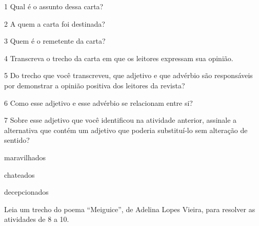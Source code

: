 \num{1} Qual é o assunto dessa carta?


\num{2} A quem a carta foi destinada?


\num{3} Quem é o remetente da carta?


\num{4} Transcreva o trecho da carta em que os leitores expressam sua opinião.


\num{5} Do trecho que você transcreveu, que adjetivo e que advérbio são responsáveis por demonstrar a opinião positiva dos leitores da revista?


\num{6} Como esse adjetivo e esse advérbio se relacionam entre si?


\num{7} Sobre esse adjetivo que você identificou na atividade anterior, assinale a alternativa que contém um adjetivo que poderia substituí-lo sem alteração de sentido?

\begin{boxlist}
 maravilhados

 chateados

 decepcionados
\end{boxlist}

Leia um trecho do poema ``Meiguice'', de Adelina Lopes Vieira, para resolver as atividades de 8 a 10.


